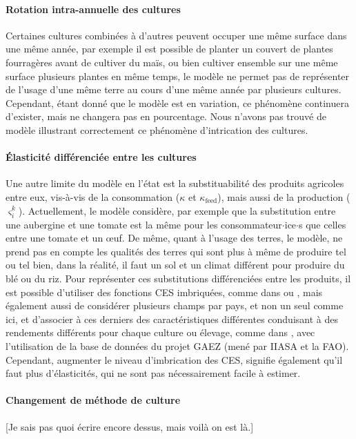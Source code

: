 \paragraph{Rotation intra-annuelle des cultures} Certaines cultures combinées à d’autres peuvent occuper une même surface dans une même année, par exemple il est possible de planter un couvert de plantes fourragères avant de cultiver du maïs, ou bien cultiver ensemble sur une même surface plusieurs plantes en même temps, le modèle ne permet pas de représenter de l’usage d’une même terre au cours d’une même année par plusieurs cultures. Cependant, étant donné que le modèle est en variation, ce phénomène continuera d’exister, mais ne changera pas en pourcentage. Nous n’avons pas trouvé de modèle illustrant correctement ce phénomène d’intrication des cultures.

\paragraph{Élasticité différenciée entre les cultures} Une autre limite du modèle en l’état est la substituabilité des produits agricoles entre eux, vis-à-vis de la consommation ($\kappa$ et $\kappa_\text{feed}$), mais aussi de la production ($\varsigma_i^k$). Actuellement, le modèle considère, par exemple que la substitution entre une aubergine et une tomate est la même pour les consommateur$\cdot$ice$\cdot$s que celles entre une tomate et un œuf. De même, quant à l’usage des terres, le modèle, ne prend pas en compte les qualités des terres qui sont plus à même de produire tel ou tel bien, dans la réalité, il faut un sol et un climat différent pour produire du blé ou du riz. Pour représenter ces substitutions différenciées entre les produits, il est possible d’utiliser des fonctions CES imbriquées, comme dans \cite{CorreaDias2025} ou \cite{Valin2023}, mais également aussi de considérer plusieurs champs par pays, et non un seul comme ici, et d’associer à ces derniers des caractéristiques différentes conduisant à des rendements différents pour chaque culture ou élevage, comme dans \cite{Gouel2021}, avec l'utilisation de la base de données du projet GAEZ (mené par IIASA et la FAO). Cependant, augmenter le niveau d'imbrication des CES, signifie également qu'il faut plus d'élasticités, qui ne sont pas nécessairement facile à estimer.

\paragraph{Changement de méthode de culture} [Je sais pas quoi écrire encore dessus, mais voilà on est là.]

